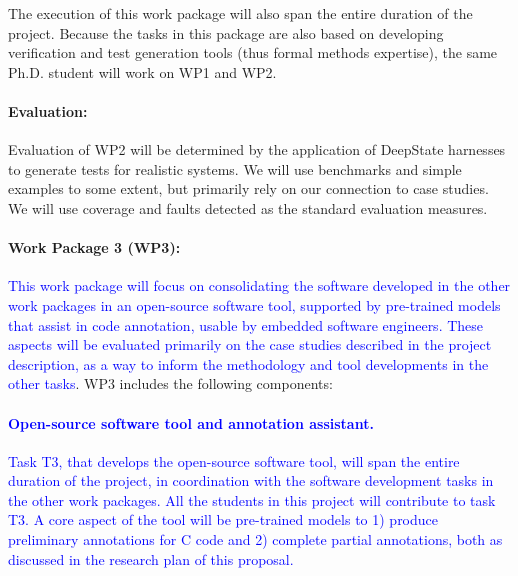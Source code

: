 The execution of this work package will also span the entire duration of the project.
Because the tasks in this package are also based on developing
verification and test generation tools (thus formal methods
expertise), the same Ph.D. student will work on WP1 and WP2. 

\paragraph{Evaluation:} Evaluation of
WP2 will be determined by the application
of DeepState harnesses to generate tests for realistic
systems.  We will use benchmarks and simple examples to some
extent, but primarily rely on our connection to case studies.
We will use coverage and faults
detected as the standard evaluation  measures.

\paragraph{Work Package 3 (WP3):}
\textcolor{blue}{%
This work package will focus on consolidating the software developed
in the other work packages in an open-source software tool, supported
by pre-trained models that assist in code annotation, usable by embedded
software engineers.  These aspects will be evaluated primarily on the
case studies described in the project description, as a way to inform the methodology and tool developments in the other tasks}.
WP3 includes the following components:
\textcolor{blue}{%
\paragraph{Open-source software tool and annotation assistant.}
Task T3, that develops the open-source software tool, will span the
entire duration of the project, in coordination with the software
development tasks in the other work packages.  All the students in
this project will contribute to task T3.  A core aspect of the tool
will be pre-trained models to 1) produce preliminary annotations for C
code and 2) complete partial annotations, both as discussed in the
research plan of this proposal.}


